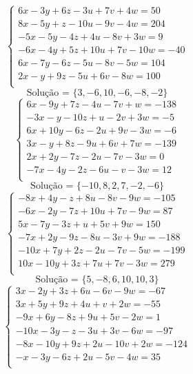 \documentclass[12pt,oneside,a4paper]{article}
\begin{document}
\vspace{\baselineskip}
\begin{equation*}
\begin{cases}
6x-3y+6z-3u+7v+4w=50 \\
8x-5y+z-10u-9v-4w=204 \\
-5x-5y-4z+4u-8v+3w=9 \\
-6x-4y+5z+10u+7v-10w=-40 \\
6x-7y-6z-5u-8v-5w=104 \\
2x-y+9z-5u+6v-8w=100 \\
\end{cases}
\end{equation*}
\begin{equation*}
\text{Solução = }\{3,-6,10,-6,-8,-2\}
\end{equation*}
\vspace{\baselineskip}
\begin{equation*}
\begin{cases}
6x-9y+7z-4u-7v+w=-138 \\
-3x-y-10z+u-2v+3w=-5 \\
6x+10y-6z-2u+9v-3w=-6 \\
3x-y+8z-9u+6v+7w=-139 \\
2x+2y-7z-2u-7v-3w=0 \\
-7x-4y-2z-6u-v-3w=12 \\
\end{cases}
\end{equation*}
\begin{equation*}
\text{Solução = }\{-10,8,2,7,-2,-6\}
\end{equation*}
\vspace{\baselineskip}
\begin{equation*}
\begin{cases}
-8x+4y-z+8u-8v-9w=-105 \\
-6x-2y-7z+10u+7v-9w=87 \\
5x-7y-3z+u+5v+9w=150 \\
-7x+2y-9z-8u-3v+9w=-188 \\
-10x+7y+2z-2u-7v-5w=-199 \\
10x-10y+3z+7u+7v-3w=279 \\
\end{cases}
\end{equation*}
\begin{equation*}
\text{Solução = }\{5,-8,6,10,10,3\}
\end{equation*}
\vspace{\baselineskip}
\begin{equation*}
\begin{cases}
3x-2y+3z+6u-6v-9w=-67 \\
3x+5y+9z+4u+v+2w=-55 \\
-9x+6y-8z+9u+5v-2w=1 \\
-10x-3y-z-3u+3v-6w=-97 \\
-8x-10y+9z+2u-10v+2w=-124 \\
-x-3y-6z+2u-5v-4w=35 \\
\end{cases}
\end{equation*}
\end{document}
